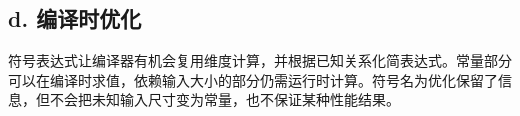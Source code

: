 \subsection*{\textbf{d. 编译时优化}}

符号表达式让编译器有机会复用维度计算，并根据已知关系化简表达式。常量部分可以在编译时求值，依赖输入大小的部分仍需运行时计算。符号名为优化保留了信息，但不会把未知输入尺寸变为常量，也不保证某种性能结果。
